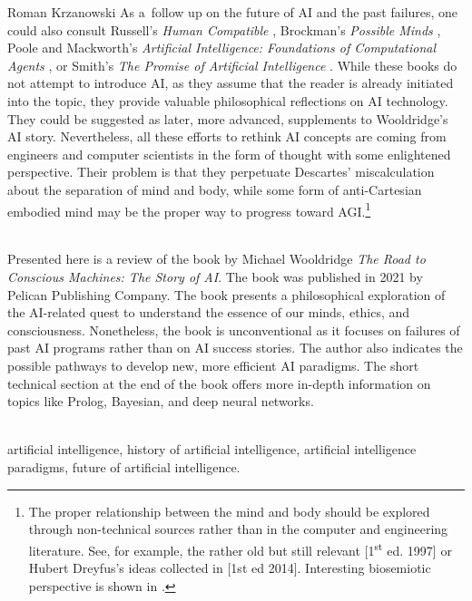\begin{newrevengenv}{Roman Krzanowski}
As a~follow up on the future of AI and the past failures, one could also consult Russell’s \textit{Human Compatible}
\parencite*{russell_human_2020},
Brockman’s \textit{Possible Minds}
\parencite*{brockman_possible_2019},
Poole and Mackworth’s \textit{Artificial Intelligence: Foundations of Computational Agents}
\parencite*{poole_artificial_2017},
or Smith’s \textit{The Promise of Artificial Intelligence}
\parencite*{smith_2019}.
While these books do not attempt to introduce AI, as they assume that the reader is already initiated into the topic, they provide valuable philosophical reflections on AI technology. They could be suggested as later, more advanced, supplements to Wooldridge’s AI story. Nevertheless, all these efforts to rethink AI concepts are coming from engineers and computer scientists in the form of thought with some enlightened perspective. Their problem is that they perpetuate Descartes’ miscalculation about the separation of mind and body, while some form of anti-Cartesian embodied mind may be the proper way to progress toward AGI.\footnote{The proper relationship between the mind and body should be explored through non-technical sources rather than in the computer and engineering literature. See, for example, the rather old but still relevant
\parencite[][pp.31–73]{abram_spell_2017} [1\textsuperscript{st} ed. 1997]
or Hubert Dreyfus’s ideas collected in
\parencite{dreyfus_skillful_2016} [1st ed 2014].
Interesting biosemiotic perspective is shown in
\parencite{sarosiek_role_2021}.
}



\vspace{15mm}%
{}\\
{Presented here  is a review of the book by  Michael Wooldridge \textit{The Road to Conscious Machines: The Story of AI}. The book was published in 2021 by Pelican Publishing Company.  The book presents a philosophical exploration of the AI-related quest to understand the essence of our minds, ethics, and consciousness. Nonetheless, the book is unconventional as it focuses on failures of past AI programs rather than on AI success stories. The author also indicates the possible pathways to develop new, more efficient  AI paradigms. The short technical section at the end of the book offers more in-depth information on topics like Prolog, Bayesian, and deep neural networks.}\par%
\vspace{2mm}%
{}\\
{artificial intelligence, history of artificial intelligence,  artificial intelligence paradigms,  future of artificial intelligence.}%



\end{newrevengenv}
